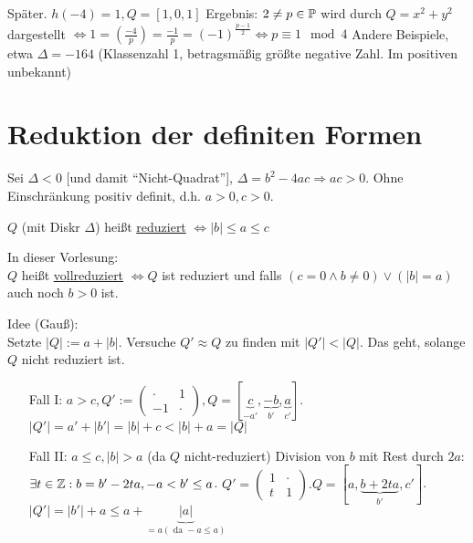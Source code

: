 \documentclass[a4paper,DIV15,BCOR12mm]{article}
\begin{document}
Später. $h(-4) = 1, Q = [1,0,1]$
Ergebnis: $2 \not= p \in \mathbb{P}$ wird durch $Q = x^2 + y^2$ dargestellt $\Leftrightarrow 1 = (\frac{-4}{p}) = \frac{-1}{p} = (-1)^{\frac{p-1}{2}} \Leftrightarrow p \equiv 1 \mod 4$
Andere Beispiele, etwa $\Delta = -164$ (Klassenzahl 1, betragsmäßig größte negative Zahl. Im positiven unbekannt)

\section{Reduktion der definiten Formen}

Sei $\Delta < 0$ [und damit "`Nicht-Quadrat"'], $\Delta = b^2 - 4ac \Rightarrow ac > 0$. Ohne Einschränkung positiv definit, d.h. $a > 0, c > 0$.
\begin{definition}[Gauß]
$Q$ (mit Diskr $\Delta$) heißt \underline{reduziert} $\Leftrightarrow |b| \le a \le c$
\end{definition}

In dieser Vorlesung:\\
$Q$ heißt \underline{vollreduziert} $\Leftrightarrow Q$ ist reduziert und falls $(c = 0 \wedge b \not= 0) \vee (|b| = a)$ auch noch $b > 0$ ist.

Idee (Gauß):\\
Setzte $|Q| := a + |b|$. Versuche $Q' \approx Q$ zu finden mit $|Q'| < |Q|$. Das geht, solange $Q$ nicht reduziert ist.
\begin{itemize}
\item[Fall I:] $a > c, Q' := \begin{pmatrix}\cdot & 1 \\ -1 & \cdot\end{pmatrix}, Q = [\underbrace{c}_{-a'}, \underbrace{-b}_{b'}, \underbrace{a}_{c'}]$. $|Q'| = a' + |b'| = |b| + c < |b| + a = |Q|$
\item[Fall II:] $a \le c, |b| > a$ (da $Q$ nicht-reduziert) Division von $b$ mit Rest durch $2a$: $\exists t \in \mathbb{Z}: b = b' - 2ta, -a < b' \le a$. $Q' = \begin{pmatrix}1 & \cdot \\ t & 1\end{pmatrix}.Q = [a, \underbrace{b + 2ta}_{b'}, c']$. $|Q'| = |b'| + a \le a + \underbrace{|a|}_{= a (\text{ da }-a \le a)}$
\end{itemize}
\end{document}
